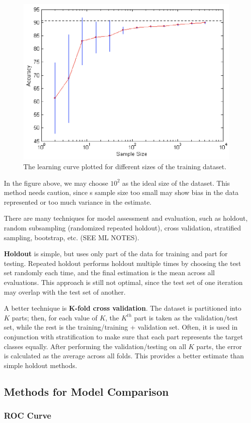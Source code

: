 \begin{figure}[h]
    \centering
    \includegraphics[width=0.5\linewidth]{img/Learning curve.png}
    \caption{The learning curve plotted for different sizes of the training dataset.}
\end{figure}
In the figure above, we may choose $10^2$ as the ideal size of the dataset. This method needs caution, since s sample size too small may show bias in the data represented or too much variance in the estimate.

There are many techniques for model assessment and evaluation, such as holdout, random subsampling (randomized repeated holdout), cross validation, stratified sampling, bootstrap, etc. (SEE ML NOTES).

\textbf{Holdout} is simple, but uses only part of the data for training and part for testing. Repeated holdout performs holdout multiple times by choosing the test set randomly each time, and the final estimation is the mean across all evaluations. This approach is still not optimal, since the test set of one iteration may overlap with the test set of another.

A better technique is \textbf{K-fold cross validation}. The dataset is partitioned into $K$ parts; then, for each value of $K$, the $K^{th}$ part is taken as the validation/test set, while the rest is the training/training + validation set. Often, it is used in conjunction with stratification to make sure that each part represents the target classes equally. After performing the validation/testing on all $K$ parts, the error is calculated as the average across all folds. This provides a better estimate than simple holdout methods.

\subsection{Methods for Model Comparison}

\subsubsection{ROC Curve}

